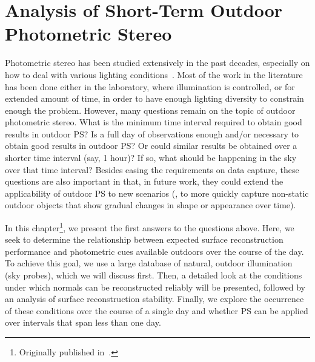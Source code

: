 \chapter{Analysis of Short-Term Outdoor Photometric Stereo}     %

\label{ch1}

Photometric stereo has been studied extensively in the past decades, especially on how to deal with various lighting conditions~\cite{alldrin-cvpr-08,basri-ijcv-07,johnson-cvpr-11,oxholm-eccv-12,ackermann-cvpr-12,abrams-eccv-12}. Most of the work in the literature has been done either in the laboratory, where illumination is controlled, or for extended amount of time, in order to have enough lighting diversity to constrain enough the problem. However, many questions remain on the topic of outdoor photometric stereo. What is the minimum time interval required to obtain good results in outdoor PS? Is a full day of observations enough and/or necessary to obtain good results in outdoor PS? Or could similar results be obtained over a shorter time interval (say, 1 hour)? If so, what should be happening in the sky over that time interval? Besides easing the requirements on data capture, these questions are also important in that, in future work, they could extend the applicability of outdoor PS to new scenarios (\eg, to more quickly capture non-static outdoor objects that show gradual changes in shape or appearance over time).


In this chapter\footnote{Originally published in~\cite{holdgeoffroy-iccp-15,holdgeoffroy-3dv-15}.}, we present the first answers to the questions above. Here, we seek to determine the relationship between expected surface reconstruction performance and photometric cues available outdoors over the course of the day. To achieve this goal, we use a large database of natural, outdoor illumination (sky probes), which we will discuss first. Then, a detailed look at the conditions under which normals can be reconstructed reliably will be presented, followed by an analysis of surface reconstruction stability. Finally, we explore the occurrence of these conditions over the course of a single day and whether PS can be applied over intervals that span less than one day.

